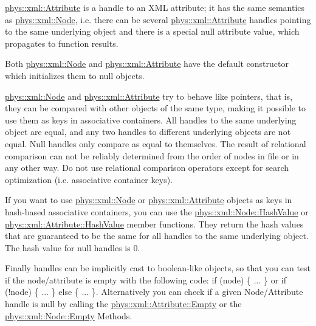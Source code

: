  \par
 \hyperlink{classphys_1_1xml_1_1Attribute}{phys::xml::Attribute} is a handle to an XML attribute; it has the same semantics as \hyperlink{classphys_1_1xml_1_1Node}{phys::xml::Node}, i.e. there can be several \hyperlink{classphys_1_1xml_1_1Attribute}{phys::xml::Attribute} handles pointing to the same underlying object and there is a special null attribute value, which propagates to function results. \par
 \par
 Both \hyperlink{classphys_1_1xml_1_1Node}{phys::xml::Node} and \hyperlink{classphys_1_1xml_1_1Attribute}{phys::xml::Attribute} have the default constructor which initializes them to null objects. \par
 \par
 \hyperlink{classphys_1_1xml_1_1Node}{phys::xml::Node} and \hyperlink{classphys_1_1xml_1_1Attribute}{phys::xml::Attribute} try to behave like pointers, that is, they can be compared with other objects of the same type, making it possible to use them as keys in associative containers. All handles to the same underlying object are equal, and any two handles to different underlying objects are not equal. Null handles only compare as equal to themselves. The result of relational comparison can not be reliably determined from the order of nodes in file or in any other way. Do not use relational comparison operators except for search optimization (i.e. associative container keys). \par
 \par
 If you want to use \hyperlink{classphys_1_1xml_1_1Node}{phys::xml::Node} or \hyperlink{classphys_1_1xml_1_1Attribute}{phys::xml::Attribute} objects as keys in hash-\/based associative containers, you can use the \hyperlink{classphys_1_1xml_1_1Node_a830a1833c4b4b012f1b4481e91ccb1ca}{phys::xml::Node::HashValue} or \hyperlink{classphys_1_1xml_1_1Attribute_ac0c27e07b705c41670a0903f4fe18378}{phys::xml::Attribute::HashValue} member functions. They return the hash values that are guaranteed to be the same for all handles to the same underlying object. The hash value for null handles is 0. \par
 \par
 Finally handles can be implicitly cast to boolean-\/like objects, so that you can test if the node/attribute is empty with the following code: if (node) \{ ... \} or if (!node) \{ ... \} else \{ ... \}. Alternatively you can check if a given Node/Attribute handle is null by calling the \hyperlink{classphys_1_1xml_1_1Attribute_a6d0157a562f283e9c87d1cc46b3405cc}{phys::xml::Attribute::Empty} or the \hyperlink{classphys_1_1xml_1_1Node_a22c00132e42702d16468489ff0bd01d8}{phys::xml::Node::Empty} Methods. \par
